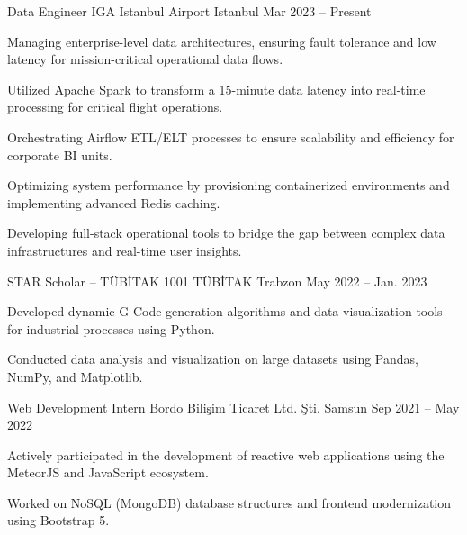 
\begin{cventries}

\cventry
  {Data Engineer}
  {IGA Istanbul Airport}
  {Istanbul}
  {Mar 2023 – Present}
  {
    \begin{cvitems}
      \item {Managing enterprise-level data architectures, ensuring fault tolerance and low latency for mission-critical operational data flows.}
      \item {Utilized Apache Spark to transform a 15-minute data latency into real-time processing for critical flight operations.}
      \item {Orchestrating Airflow ETL/ELT processes to ensure scalability and efficiency for corporate BI units.}
      \item {Optimizing system performance by provisioning containerized environments and implementing advanced Redis caching.}
      \item {Developing full-stack operational tools to bridge the gap between complex data infrastructures and real-time user insights.}
    \end{cvitems}
  }
  \cventry
    {STAR Scholar – TÜBİTAK 1001} %
    {TÜBİTAK} %
    {Trabzon} %
    {May 2022 – Jan. 2023} %
    {
      \begin{cvitems} %
        \item {Developed dynamic G-Code generation algorithms and data visualization tools for industrial processes using Python.}
        \item {Conducted data analysis and visualization on large datasets using Pandas, NumPy, and Matplotlib.}
      \end{cvitems}
    }

  \cventry
    {Web Development Intern} %
    {Bordo Bilişim Ticaret Ltd. Şti.} %
    {Samsun} %
    {Sep 2021 – May 2022} %
    {
      \begin{cvitems} %
        \item {Actively participated in the development of reactive web applications using the MeteorJS and JavaScript ecosystem.}
        \item {Worked on NoSQL (MongoDB) database structures and frontend modernization using Bootstrap 5.}
      \end{cvitems}
    }
\newline

\end{cventries}
